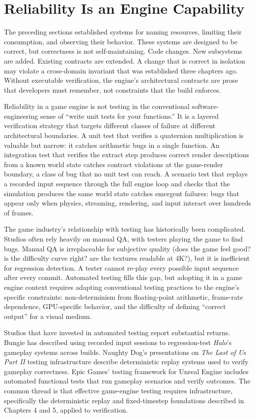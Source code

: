\documentclass[
  11pt,
  letterpaper,
  DIV=11,
  numbers=noendperiod,
  twoside,
  open=right]{scrreprt}
\begin{document}
\section{Reliability Is an Engine Capability}\label{sec-reliability}

The preceding sections established systems for naming resources,
limiting their consumption, and observing their behavior. These systems
are designed to be correct, but correctness is not self-maintaining.
Code changes. New subsystems are added. Existing contracts are extended.
A change that is correct in isolation may violate a cross-domain
invariant that was established three chapters ago. Without executable
verification, the engine's architectural contracts are prose that
developers must remember, not constraints that the build enforces.

Reliability in a game engine is not testing in the conventional
software-engineering sense of ``write unit tests for your functions.''
It is a layered verification strategy that targets different classes of
failure at different architectural boundaries. A unit test that verifies
a quaternion multiplication is valuable but narrow: it catches
arithmetic bugs in a single function. An integration test that verifies
the extract step produces correct render descriptions from a known world
state catches contract violations at the game-render boundary, a class
of bug that no unit test can reach. A scenario test that replays a
recorded input sequence through the full engine loop and checks that the
simulation produces the same world state catches emergent failures: bugs
that appear only when physics, streaming, rendering, and input interact
over hundreds of frames.

The game industry's relationship with testing has historically been
complicated. Studios often rely heavily on manual QA, with testers
playing the game to find bugs. Manual QA is irreplaceable for subjective
quality (does the game feel good? is the difficulty curve right? are the
textures readable at 4K?), but it is inefficient for regression
detection. A tester cannot re-play every possible input sequence after
every commit. Automated testing fills this gap, but adopting it in a
game engine context requires adapting conventional testing practices to
the engine's specific constraints: non-determinism from floating-point
arithmetic, frame-rate dependence, GPU-specific behavior, and the
difficulty of defining ``correct output'' for a visual medium.

Studios that have invested in automated testing report substantial
returns. Bungie has described using recorded input sessions to
regression-test \emph{Halo}'s gameplay systems across builds. Naughty
Dog's presentations on \emph{The Last of Us Part II} testing
infrastructure describe deterministic replay systems used to verify
gameplay correctness. Epic Games' testing framework for Unreal Engine
includes automated functional tests that run gameplay scenarios and
verify outcomes. The common thread is that effective game-engine testing
requires infrastructure, specifically the deterministic replay and
fixed-timestep foundations described in Chapters 4 and 5, applied to
verification.
\end{document}
